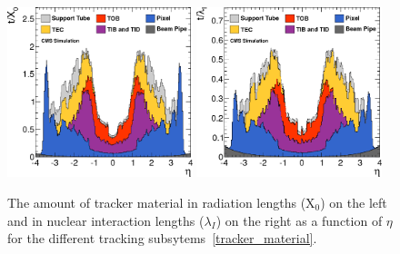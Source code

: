 \begin{figure}
  \includegraphics[width=0.48\textwidth]{cms_experiment/plots/tracker_material.png}
  \includegraphics[width=0.48\textwidth]{cms_experiment/plots/tracker_material_lambda.png}
  \caption[\acs{CMS} tracker material budget]{The amount of \CMS tracker material in radiation lengths (X$_{0}$) on the left and in nuclear interaction lengths ($\lambda_{I}$) on the right as a function of $\eta$ for the different tracking subsytems~\ref{tracker_material}.}
  \label{fig:tracker_material}
\end{figure}

